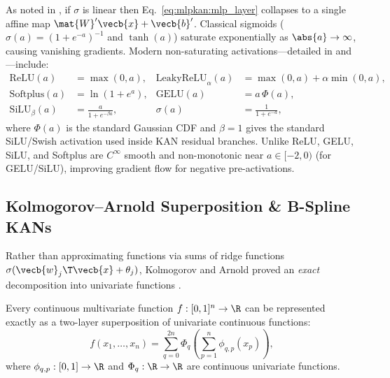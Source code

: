 \documentclass[../../../../master.tex]{subfiles}
\begin{document}
As noted in , if $\sigma$ is linear then Eq.~\eqref{eq:mlpkan:mlp_layer} collapses to a single affine map $\mat{W}' \vecb{x} + \vecb{b}'$. Classical sigmoids ($\sigma(a) = (1+e^{-a})^{-1}$ and $\tanh(a)$) saturate exponentially as $\abs{a} \to \infty$, causing vanishing gradients. Modern non-saturating activations---detailed in  and ---include:
\begin{align}
  \mathrm{ReLU}(a) &= \max(0, a), &
  \mathrm{LeakyReLU}_\alpha(a) &= \max(0, a) + \alpha \min(0, a), \label{eq:mlpkan:relu_leaky} \\
  \mathrm{Softplus}(a) &= \ln(1 + e^a), &
  \mathrm{GELU}(a) &= a\,\Phi(a), \label{eq:mlpkan:softplus_gelu} \\
  \mathrm{SiLU}_\beta(a) &= \frac{a}{1 + e^{-\beta a}}, &
  \sigma(a) &= \frac{1}{1 + e^{-a}}, \label{eq:mlpkan:smooth_acts}
\end{align}
where $\Phi(a)$ is the standard Gaussian CDF and $\beta=1$ gives the standard SiLU/Swish activation used inside KAN residual branches. Unlike ReLU, GELU, SiLU, and Softplus are $C^\infty$ smooth and non-monotonic near $a \in [-2, 0)$ (for GELU/SiLU), improving gradient flow for negative pre-activations.

\subsection{Kolmogorov--Arnold Superposition \& B-Spline KANs}

Rather than approximating functions via sums of ridge functions $\sigma(\vecb{w}_j\T \vecb{x} + \theta_j)$, Kolmogorov and Arnold proved an \emph{exact} decomposition into univariate functions .

\begin{coremath}
\label{thm:mlpkan:ka_theorem}
Every continuous multivariate function $f : [0,1]^n \to \R$ can be represented exactly as a two-layer superposition of univariate continuous functions:
\begin{equation}
  \label{eq:mlpkan:ka_rep}
  f(x_1, \dots, x_n) = \sum_{q=0}^{2n} \Phi_q\!\left(\sum_{p=1}^n \phi_{q,p}(x_p)\right),
\end{equation}
where $\phi_{q,p} : [0,1] \to \R$ and $\Phi_q : \R \to \R$ are continuous univariate functions.
\end{coremath}
\end{document}
